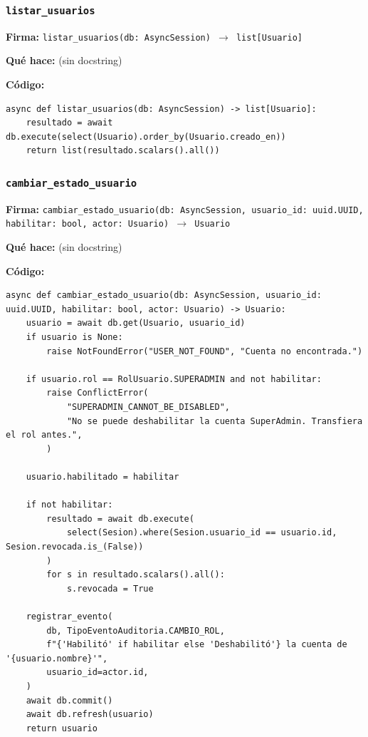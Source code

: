 \documentclass[11pt,a4paper]{article}
\begin{document}
\subsubsection*{\texttt{listar\_usuarios}}
\textbf{Firma:} \texttt{listar\_usuarios(db: AsyncSession) $\rightarrow$ list[Usuario]}

\textbf{Qué hace:} (sin docstring)

\textbf{Código:}
\begin{lstlisting}
async def listar_usuarios(db: AsyncSession) -> list[Usuario]:
    resultado = await db.execute(select(Usuario).order_by(Usuario.creado_en))
    return list(resultado.scalars().all())
\end{lstlisting}

\subsubsection*{\texttt{cambiar\_estado\_usuario}}
\textbf{Firma:} \texttt{cambiar\_estado\_usuario(db: AsyncSession, usuario\_id: uuid.UUID, habilitar: bool, actor: Usuario) $\rightarrow$ Usuario}

\textbf{Qué hace:} (sin docstring)

\textbf{Código:}
\begin{lstlisting}
async def cambiar_estado_usuario(db: AsyncSession, usuario_id: uuid.UUID, habilitar: bool, actor: Usuario) -> Usuario:
    usuario = await db.get(Usuario, usuario_id)
    if usuario is None:
        raise NotFoundError("USER_NOT_FOUND", "Cuenta no encontrada.")

    if usuario.rol == RolUsuario.SUPERADMIN and not habilitar:
        raise ConflictError(
            "SUPERADMIN_CANNOT_BE_DISABLED",
            "No se puede deshabilitar la cuenta SuperAdmin. Transfiera el rol antes.",
        )

    usuario.habilitado = habilitar

    if not habilitar:
        resultado = await db.execute(
            select(Sesion).where(Sesion.usuario_id == usuario.id, Sesion.revocada.is_(False))
        )
        for s in resultado.scalars().all():
            s.revocada = True

    registrar_evento(
        db, TipoEventoAuditoria.CAMBIO_ROL,
        f"{'Habilitó' if habilitar else 'Deshabilitó'} la cuenta de '{usuario.nombre}'",
        usuario_id=actor.id,
    )
    await db.commit()
    await db.refresh(usuario)
    return usuario
\end{lstlisting}
\end{document}
